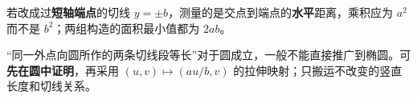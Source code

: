 \begin{trapbox}
\begin{description}[style=nextline,leftmargin=2.8em,labelsep=0.5em,itemsep=0.65em]
\item[\textbf{\textcolor{CTrap}{易错 9：交换端点后仍写 $b^2$。}}]
若改成过\textbf{短轴端点}的切线 $y=\pm b$，测量的是交点到端点的\textbf{水平}距离，乘积应为 $a^2$ 而不是 $b^2$；两组构造的面积最小值都为 $2ab$。

\item[\textbf{\textcolor{CTrap}{易错 10：将圆的切线段等长直接用于椭圆。}}]
“同一外点向圆所作的两条切线段等长”对于圆成立，一般不能直接推广到椭圆。可\textbf{先在圆中证明}，再采用 $(u,v)\mapsto(au/b,v)$ 的拉伸映射；只搬运不改变的竖直长度和切线关系。
\end{description}
\end{trapbox}
